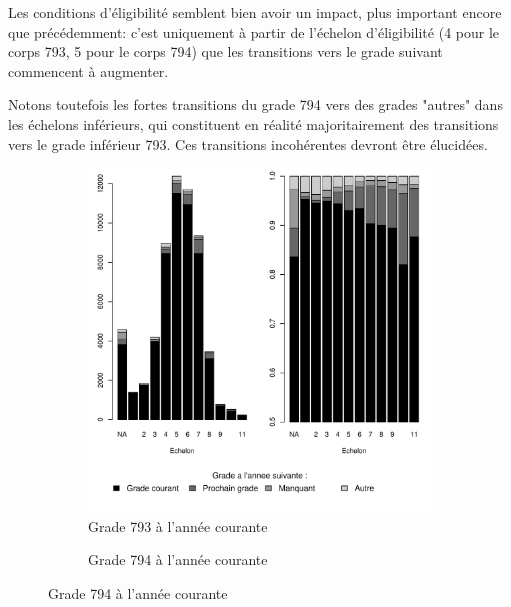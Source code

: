 \documentclass[11pt,a4paper]{article}
\begin{document}
Les conditions d'éligibilité semblent bien avoir un impact, plus important encore que précédemment: c'est uniquement à partir de l'échelon d'éligibilité (4 pour le corps 793, 5 pour le corps 794) que les transitions vers le grade suivant commencent à augmenter.  

Notons toutefois les fortes transitions du grade 794 vers des grades "autres" dans les échelons inférieurs, qui constituent en réalité majoritairement des transitions vers le grade inférieur 793. Ces transitions incohérentes devront être élucidées. 

\bigskip

\begin{figure}[ht] 
  \caption{Situation d'une année à l'autre, selon l'échelon}
  \label{evo_by_ech} 
  \begin{subfigure}[b]{0.5\linewidth}
      \caption{Grade 793 à l'année courante}
    \label{evo_by_ech_793} 
    \centering
    \includegraphics[width=1\linewidth]{AT_hazard_by_ech_793.pdf} 
  \end{subfigure}
  \begin{subfigure}[b]{0.5\linewidth}
        \caption{Grade 794 à l'année courante} 
    \label{evo_by_ech_794} 
    \centering

\end{subfigure}
\end{figure}
\end{document}
